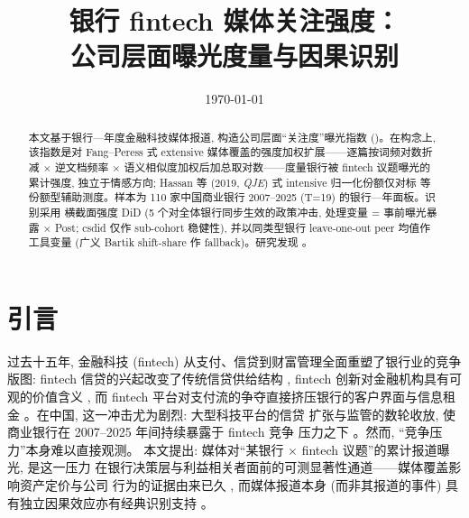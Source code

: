 




\title{银行 fintech 媒体关注强度：\\公司层面曝光度量与因果识别}
\author{}
\date{\today}


\maketitle

\begin{abstract}
本文基于银行—年度金融科技媒体报道, 构造公司层面``关注度''曝光指数
()。在构念上, 该指数是对 Fang--Peress 式
extensive 媒体覆盖的强度加权扩展——逐篇按词频对数折减 $\times$ 逆文档频率
$\times$ 语义相似度加权后加总取对数——度量银行被 fintech 议题曝光的累计强度,
独立于情感方向; Hassan 等 (2019, \emph{QJE}) 式 intensive 归一化份额仅对标
 等份额型辅助测度。样本为 110 家中国商业银行
 2007--2025 (T=19) 的银行—年面板。识别采用
横截面强度 DiD (5 个对全体银行同步生效的政策冲击, 处理变量 = 事前曝光暴露
$\times$ Post; csdid 仅作 sub-cohort 稳健性), 并以同类型银行 leave-one-out
peer 均值作工具变量 (广义 Bartik shift-share 作 fallback)。研究发现
\@。
\end{abstract}

\section{引言}\label{sec:intro}

过去十五年, 金融科技 (fintech) 从支付、信贷到财富管理全面重塑了银行业的竞争
版图: fintech 信贷的兴起改变了传统信贷供给结构 \parencite{berg2022fintechlending},
fintech 创新对金融机构具有可观的价值含义 \parencite{chen2019fintechvalue},
而 fintech 平台对支付流的争夺直接挤压银行的客户界面与信息租金
\parencite{parlour2022payment}。在中国, 这一冲击尤为剧烈: 大型科技平台的信贷
扩张与监管的数轮收放, 使商业银行在 2007--2025 年间持续暴露于 fintech 竞争
压力之下 \parencite{hau2024fintechcredit}。然而, ``竞争压力''本身难以直接观测。
本文提出: 媒体对``某银行 $\times$ fintech 议题''的累计报道曝光, 是这一压力
在银行决策层与利益相关者面前的可测显著性通道——媒体覆盖影响资产定价与公司
行为的证据由来已久 \parencite{fang2009media,da2011attention}, 而媒体报道本身
(而非其报道的事件) 具有独立因果效应亦有经典识别支持
\parencite{engelberg2011causal,peress2014strikes}。

